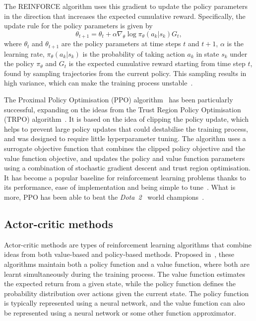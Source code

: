 The REINFORCE algorithm uses this gradient to update the policy parameters in the direction that increases the expected cumulative reward. Specifically, the update rule for the policy parameters is given by
\begin{equation}
    \theta_{t+1} = \theta_t + \alpha \nabla_{\theta} \log \pi_{\theta}(a_k|s_k) G_t,
\end{equation}
where $\theta_t$ and $\theta_{t+1}$ are the policy parameters at time steps $t$ and $t+1$, $\alpha$ is the learning rate, $\pi_{\theta}(a_k|s_k)$ is the probability of taking action $a_k$ in state $s_k$ under the policy $\pi_{\theta}$ and $G_t$ is the expected cumulative reward starting from time step $t$, found by sampling trajectories from the current policy.
This sampling results in high variance, which can make the training process unstable~\autocite{arulkumaran2017}.

The Proximal Policy Optimisation (PPO) algorithm~\autocite{schulman2017} has been particularly successful, expanding on the ideas from the Trust Region Policy Optimisation (TRPO) algorithm~\autocite{schulman2015}.
It is based on the idea of clipping the policy update, which helps to prevent large policy updates that could destabilise the training process, and was designed to require little hyperparameter tuning.
The algorithm uses a surrogate objective function that combines the clipped policy objective and the value function objective, and updates the policy and value function parameters using a combination of stochastic gradient descent and trust region optimisation.
It has become a popular baseline for reinforcement learning problems thanks to its performance, ease of implementation and being simple to tune~\autocite{schulman2017}.
What is more, PPO has been able to beat the \textit{Dota~2}~\autocite{dota} world champions~\autocite{brockman2018,openai2019}.

\subsection{Actor-critic methods}
Actor-critic methods are types of reinforcement learning algorithms that combine ideas from both value-based and policy-based methods.
Proposed in~\autocite{konda1999}, these algorithms maintain both a policy function and a value function, where both are learnt simultaneously during the training process.
The value function estimates the expected return from a given state, while the policy function defines the probability distribution over actions given the current state.
The policy function is typically represented using a neural network, and the value function can also be represented using a neural network or some other function approximator.

